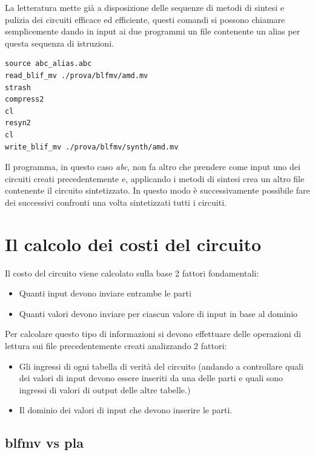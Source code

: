 \documentclass[
  italian,
]{book}
\providecommand{\tightlist}{%
  \setlength{\itemsep}{0pt}\setlength{\parskip}{0pt}}
\begin{document}
La letteratura mette già a disposizione delle sequenze di metodi di sintesi e pulizia dei circuiti efficace ed efficiente, questi comandi si possono chiamare semplicemente dando in input ai due programmi un file contenente un alias per questa sequenza di istruzioni.

\begin{verbatim}
source abc_alias.abc
read_blif_mv ./prova/blfmv/amd.mv
strash
compress2
cl
resyn2
cl
write_blif_mv ./prova/blfmv/synth/amd.mv
\end{verbatim}

Il programma, in questo caso \emph{abc}, non fa altro che prendere come input uno dei circuiti creati precedentemente e, applicando i metodi di sintesi crea un altro file contenente il circuito sintetizzato. In questo modo è successivamente possibile fare dei successivi confronti una volta sintetizzati tutti i circuiti.

\hypertarget{il-calcolo-dei-costi-del-circuito}{%
\section{Il calcolo dei costi del circuito}\label{il-calcolo-dei-costi-del-circuito}}

Il costo del circuito viene calcolato sulla base 2 fattori fondamentali:

\begin{itemize}
\tightlist
\item
  Quanti input devono inviare entrambe le parti
\item
  Quanti valori devono inviare per ciascun valore di input in base al dominio
\end{itemize}

Per calcolare questo tipo di informazioni si devono effettuare delle operazioni di lettura sui file precedentemente creati analizzando 2 fattori:

\begin{itemize}
\tightlist
\item
  Gli ingressi di ogni tabella di verità del circuito (andando a controllare quali dei valori di input devono essere inseriti da una delle parti e quali sono ingressi di valori di output delle altre tabelle.)
\item
  Il dominio dei valori di input che devono inserire le parti.
\end{itemize}

\newpage

\hypertarget{blfmv-vs-pla}{%
\subsection{blfmv vs pla}\label{blfmv-vs-pla}}
\end{document}
